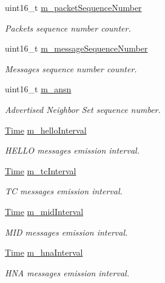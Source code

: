 \begin{DoxyCompactItemize}
uint16\+\_\+t \hyperlink{classns3_1_1olsr_1_1RoutingProtocol_aa5051691fb81c7109b9e2b6c54b43b7f}{m\+\_\+packet\+Sequence\+Number}
\begin{DoxyCompactList}\small\item\em Packets sequence number counter. \end{DoxyCompactList}\item 
uint16\+\_\+t \hyperlink{classns3_1_1olsr_1_1RoutingProtocol_a0f6d3f3ae8a78fbf2e2522d9f21e23ca}{m\+\_\+message\+Sequence\+Number}
\begin{DoxyCompactList}\small\item\em Messages sequence number counter. \end{DoxyCompactList}\item 
uint16\+\_\+t \hyperlink{classns3_1_1olsr_1_1RoutingProtocol_a8c7b6d3b6eab86260e8ac9848e6f2621}{m\+\_\+ansn}
\begin{DoxyCompactList}\small\item\em Advertised Neighbor Set sequence number. \end{DoxyCompactList}\item 
\hyperlink{classns3_1_1Time}{Time} \hyperlink{classns3_1_1olsr_1_1RoutingProtocol_ac973c86cbf21168c11cd7f16acc1ae4c}{m\+\_\+hello\+Interval}
\begin{DoxyCompactList}\small\item\em H\+E\+L\+LO messages\textquotesingle{} emission interval. \end{DoxyCompactList}\item 
\hyperlink{classns3_1_1Time}{Time} \hyperlink{classns3_1_1olsr_1_1RoutingProtocol_ae282dcb4112be0b4f2ac8f413b022fa9}{m\+\_\+tc\+Interval}
\begin{DoxyCompactList}\small\item\em TC messages\textquotesingle{} emission interval. \end{DoxyCompactList}\item 
\hyperlink{classns3_1_1Time}{Time} \hyperlink{classns3_1_1olsr_1_1RoutingProtocol_a9109a692ebfe241e01a68a584a4961b9}{m\+\_\+mid\+Interval}
\begin{DoxyCompactList}\small\item\em M\+ID messages\textquotesingle{} emission interval. \end{DoxyCompactList}\item 
\hyperlink{classns3_1_1Time}{Time} \hyperlink{classns3_1_1olsr_1_1RoutingProtocol_a0d117664d5991c4b405b9ef14c33ea23}{m\+\_\+hna\+Interval}
\begin{DoxyCompactList}\small\item\em H\+NA messages\textquotesingle{} emission interval. \end{DoxyCompactList}\item 

\end{DoxyCompactItemize}
